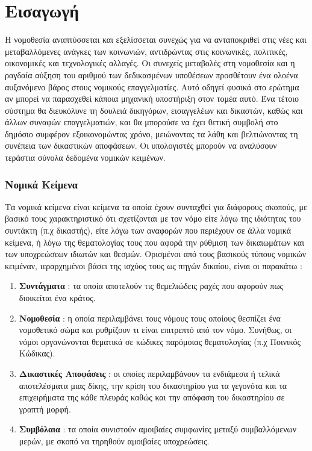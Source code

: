 \documentclass[diploma]{softlab-thesis}
\begin{document}
\begin{acknowledgementsen}

\end{acknowledgementsen}



\tableofcontents
\listoffigures



\mainmatter

\chapter{Εισαγωγή}

Η νομοθεσία αναπτύσσεται και εξελίσσεται συνεχώς για να ανταποκριθεί στις νέες και μεταβαλλόμενες ανάγκες των κοινωνιών, αντιδρώντας στις κοινωνικές, πολιτικές, οικονομικές και τεχνολογικές αλλαγές. Οι συνεχείς μεταβολές στη νομοθεσία και η ραγδαία αύξηση του αριθμού των δεδικασμένων υποθέσεων προσθέτουν ένα ολοένα αυξανόμενο βάρος στους νομικούς επαγγελματίες. Αυτό οδηγεί φυσικά στο ερώτημα αν μπορεί να παρασχεθεί κάποια μηχανική υποστήριξη στον τομέα αυτό. Ένα τέτοιο σύστημα θα διευκόλυνε τη δουλειά δικηγόρων, εισαγγελέων και δικαστών, καθώς και άλλων συναφών επαγγελματιών, και θα μπορούσε να έχει θετική συμβολή στο δημόσιο συμφέρον εξοικονομώντας χρόνο, μειώνοντας τα λάθη και βελτιώνοντας τη συνέπεια των δικαστικών αποφάσεων. Οι υπολογιστές μπορούν να αναλύσουν τεράστια σύνολα δεδομένα νομικών κειμένων.

\subsection{Νομικά Κείμενα}

Τα νομικά κείμενα είναι κείμενα τα οποία έχουν συνταχθεί για διάφορους σκοπούς, με βασικό τους χαρακτηριστικό ότι σχετίζονται με τον νόμο είτε λόγω της ιδιότητας του συντάκτη (π.χ δικαστής), είτε λόγω των αναφορών που περιέχουν σε άλλα νομικά κείμενα, ή λόγω της θεματολογίας τους που αφορά την ρύθμιση των δικαιωμάτων και των υποχρεώσεων ιδιωτών και θεσμών. Ορισμένοι από τους βασικούς τύπους νομικών κειμέναν, ιεραρχημένοι βάσει της ισχύος τους ως πηγών δικαίου, είναι οι παρακάτω :

\begin{enumerate}
\item \textbf{Συντάγματα} : τα οποία αποτελούν τις θεμελιώδεις ραχές που αφορούν πως διοικείται ένα κράτος.
\item \textbf{Νομοθεσία} : η οποία περιλαμβάνει τους νόμους τους οποίους θεσπίζει ένα νομοθετικό σώμα και ρυθμίζουν τι είναι επιτρεπτό από τον νόμο. Συνήθως, οι νόμοι οργανώνονται θεματικά σε κώδικες παρόμοιας θεματολογίας (π.χ Ποινικός Κώδικας).
\item \textbf{Δικαστικές Αποφάσεις} : οι οποίες περιλαμβάνουν τα ενδιάμεσα ή τελικά αποτελέσματα μιας δίκης, την κρίση του δικαστηρίου για τα γεγονότα και τα επιχειρήματα της κάθε πλευράς καθώς και την απόφαση του δικαστηρίου σε γραπτή μορφή.
\item \textbf{Συμβόλαια} : τα οποία συνιστούν αμοιβαίες συμφωνίες μεταξύ συμβαλλόμενων μερών, με σκοπό να τηρηθούν αμοιβαίες υποχρεώσεις.
\end{enumerate}
\end{document}
